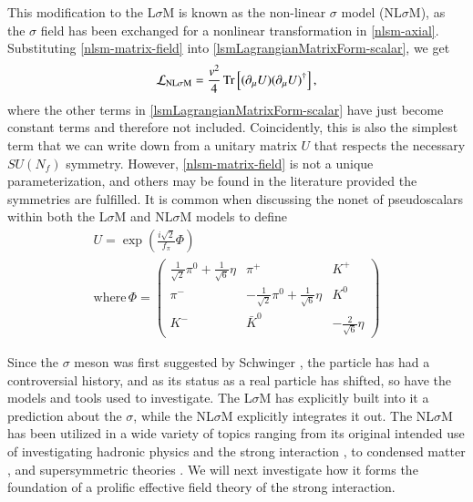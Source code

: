 \documentclass[aps,prd,onecolumn,showpacs,amsmath,amssymb,nofootinbib]{revtex4} \pdfoutput=1
\newcommand{\lsm}{L$\sigma$M}
\newcommand{\nlsm}{NL$\sigma$M}
\begin{document}
This modification to the {\lsm} is known as the non-linear $\sigma$ model (\nlsm), as the $\sigma$ field has been exchanged for a nonlinear transformation in \eqref{nlsm-axial}. Substituting \eqref{nlsm-matrix-field} into \eqref{lsmLagrangianMatrixForm-scalar}, we get
\begin{equation}
    \label{nlsm-lagrangian}
    \mathcal{L}_{\mathrm{NL\sigma M}} = \frac{v^2}{4}\Tr \left [ (\partial_{\mu} U)(\partial_{\mu} U)^\dagger\right],
\end{equation}
where the other terms in \eqref{lsmLagrangianMatrixForm-scalar} have just become constant terms and therefore not included. Coincidently, this is also the simplest term that we can write down from a unitary matrix $U$ that respects the necessary $S\!U(N_f)$ symmetry. However, \eqref{nlsm-matrix-field} is not a unique parameterization, and others may be found in the literature provided the symmetries are fulfilled. It is common when discussing the nonet of pseudoscalars within both the {\lsm} and {\nlsm} models to define 
\begin{gather}
    \label{pseudoscalar-matrix1}
    U = \exp (\frac{i \sqrt{2}}{f_\pi}\Phi)\\
    \mathrm{where}\,
    \Phi =  \begin{pmatrix}
          \frac{1}{\sqrt{2}}\pi^{0}+\frac{1}{\sqrt{6}}\eta & \pi^{+} & K^{+} \\
          \pi^{-} & -\frac{1}{\sqrt{2}}\pi^{0}+\frac{1}{\sqrt{6}}\eta & K^{0} \\
          K^{-} & \bar{K}^{0} & -\frac{2}{\sqrt{6}} \eta  \label{pseudoscalar-matrix2}
        \end{pmatrix}
\end{gather}


Since the $\sigma$ meson was first suggested by Schwinger \cite{Schwinger1957}, the particle has had a controversial history, and as its status as a real particle has shifted, so have the models and tools used to investigate. The {\lsm} has explicitly built into it a prediction about the $\sigma$, while the {\nlsm} explicitly integrates it out. The {\nlsm} has been utilized in a wide variety of topics ranging from its original intended use of investigating hadronic physics and the strong interaction \cite{GellMann1960}, to condensed matter \cite{nlsm-condmat1,nlsm-condmat2}, and supersymmetric theories \cite{Bagger1984,Witten1988}. We will next investigate how it forms the foundation of a prolific effective field theory of the strong interaction.
\end{document}
